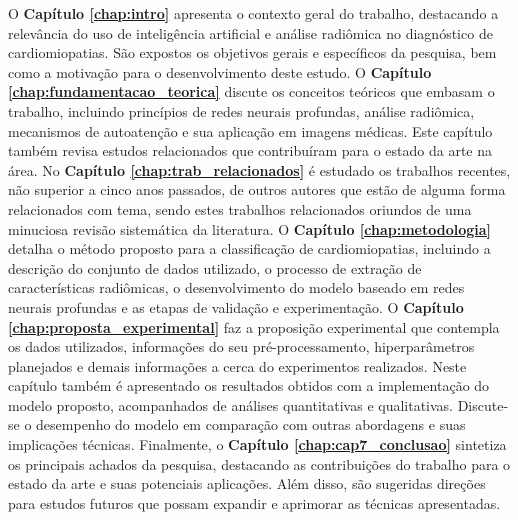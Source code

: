 O \textbf{Capítulo \ref{chap:intro}} apresenta o contexto geral do trabalho, destacando a relevância do uso de inteligência artificial e análise radiômica no diagnóstico de cardiomiopatias. São expostos os objetivos gerais e específicos da pesquisa, bem como a motivação para o desenvolvimento deste estudo. O \textbf{Capítulo \ref{chap:fundamentacao_teorica}} discute os conceitos teóricos que embasam o trabalho, incluindo princípios de redes neurais profundas, análise radiômica, mecanismos de autoatenção e sua aplicação em imagens médicas. Este capítulo também revisa estudos relacionados que contribuíram para o estado da arte na área. No \textbf{Capítulo \ref{chap:trab_relacionados}} é estudado  os trabalhos recentes, não superior a cinco anos passados, de outros autores que estão de alguma forma relacionados com tema, sendo estes trabalhos relacionados oriundos de uma minuciosa revisão sistemática da literatura. O \textbf{Capítulo \ref{chap:metodologia}} detalha o método proposto para a classificação de cardiomiopatias, incluindo a descrição do conjunto de dados utilizado, o processo de extração de características radiômicas, o desenvolvimento do modelo baseado em redes neurais profundas e as etapas de validação e experimentação. O \textbf{Capítulo \ref{chap:proposta_experimental}} faz a proposição experimental que contempla os dados utilizados, informações do seu pré-processamento, hiperparâmetros planejados e demais informações a cerca do experimentos realizados. Neste capítulo também é apresentado os resultados obtidos com a implementação do modelo proposto, acompanhados de análises quantitativas e qualitativas. Discute-se o desempenho do modelo em comparação com outras abordagens e suas implicações técnicas. Finalmente, o \textbf{Capítulo \ref{chap:cap7_conclusao}} sintetiza os principais achados da pesquisa, destacando as contribuições do trabalho para o estado da arte e suas potenciais aplicações. Além disso, são sugeridas direções para estudos futuros que possam expandir e aprimorar as técnicas apresentadas.


